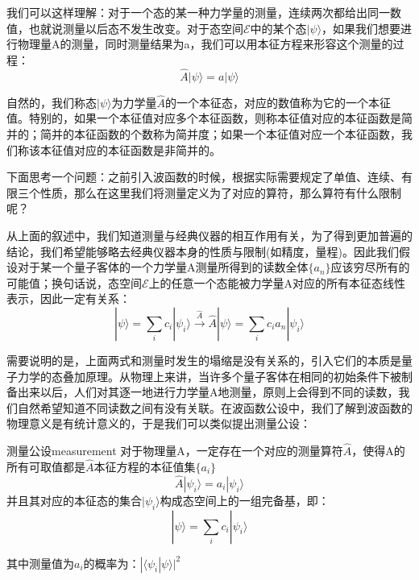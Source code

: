         我们可以这样理解：对于一个态的某一种力学量的测量，连续两次都给出同一数值，也就说测量以后态不发生改变。对于态空间$\mathscr{E}$中的某个态$|\psi\rangle$，如果我们想要进行物理量A的测量，同时测量结果为a，我们可以用本征方程来形容这个测量的过程：
        \begin{equation}
            \hat{A}|\psi\rangle=a|\psi\rangle
        \end{equation}
        
        自然的，我们称态$|\psi\rangle$为力学量$\hat{A}$的一个本征态，对应的数值称为它的一个本征值。特别的，如果一个本征值对应多个本征函数，则称本征值对应的本征函数是简并的；简并的本征函数的个数称为简并度；如果一个本征值对应一个本征函数，我们称该本征值对应的本征函数是非简并的。
        
        下面思考一个问题：之前引入波函数的时候，根据实际需要规定了单值、连续、有限三个性质，那么在这里我们将测量定义为了对应的算符，那么算符有什么限制呢？
        
        从上面的叙述中，我们知道测量与经典仪器的相互作用有关，为了得到更加普遍的结论，我们希望能够略去经典仪器本身的性质与限制(如精度，量程)。因此我们假设对于某一个量子客体的一个力学量A测量所得到的读数全体$\{a_n\}$应该穷尽所有的可能值；换句话说，态空间$\mathscr{E}$上的任意一个态能被力学量A对应的所有本征态线性表示，因此一定有关系：
        \begin{equation}
            |\psi\rangle=\sum_i c_i|\psi_i\rangle\xrightarrow{\hat{A}}\hat{A}|\psi\rangle=\sum_i c_ia_n|\psi_i\rangle
        \end{equation}
        
        需要说明的是，上面两式和测量时发生的塌缩是没有关系的，引入它们的本质是量子力学的态叠加原理。从物理上来讲，当许多个量子客体在相同的初始条件下被制备出来以后，人们对其逐一地进行力学量A地测量，原则上会得到不同的读数，我们自然希望知道不同读数之间有没有关联。在波函数公设中，我们了解到波函数的物理意义是有统计意义的，于是我们可以类似提出测量公设：
        \begin{definition}{测量公设}{measurement}
            对于物理量A，一定存在一个对应的测量算符$\hat{A}$，使得A的所有可取值都是$\hat{A}$本征方程的本征值集$\{a_i\}$
            \begin{equation}
                 \hat{A}|\psi_i\rangle=a_i|\psi_i\rangle
            \end{equation}
            并且其对应的本征态的集合$|\psi_i\rangle$构成态空间上的一组完备基，即：
            \begin{equation}
                |\psi\rangle=\sum_i c_i|\psi_i\rangle
            \end{equation}
            
            其中测量值为$a_i$的概率为：$|\langle \psi_i|\psi\rangle|^2$
        \end{definition}
        
